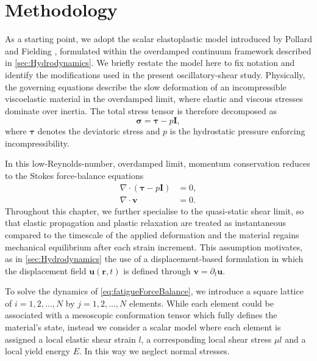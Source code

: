 \section{Methodology} \label{sec:fatigueMethodology}

As a starting point, we adopt the scalar elastoplastic model introduced by Pollard and Fielding \cite{pollard_yielding_2022}, formulated within the overdamped continuum framework described in \cref{sec:Hydrodynamics}. We briefly restate the model here to fix notation and identify the modifications used in the present oscillatory-shear study. Physically, the governing equations describe the slow deformation of an incompressible viscoelastic material in the overdamped limit, where elastic and viscous stresses dominate over inertia. The total stress tensor is therefore decomposed as
\[
    \bm{\sigma} = \bm{\tau} - p\bm{I},
\]
where $\bm{\tau}$ denotes the deviatoric stress and $p$ is the hydrostatic pressure enforcing incompressibility.

In this low-Reynolds-number, overdamped limit, momentum conservation reduces to the Stokes force-balance equations
\begin{subequations}
\label{eq:fatigueForceBalance}
\begin{align}
\nabla \cdot (\bm{\tau} - p\bm{I}) &= 0, \\
\nabla \cdot \bm{v} &= 0.
\end{align}
\end{subequations}
Throughout this chapter, we further specialise to the quasi-static shear limit, so that elastic propagation and plastic relaxation are treated as instantaneous compared to the timescale of the applied deformation and the material regains mechanical equilibrium after each strain increment. This assumption motivates, as in \cref{sec:Hydrodynamics} the use of a displacement-based formulation in which the displacement field $\bm{u}(\bm{r},t)$ is defined through $\bm{v} = \partial_t \bm{u}$.

To solve the dynamics of \cref{eq:fatigueForceBalance}, we introduce a square lattice of $i=1,2,\ldots,N$ by $j=1,2,\ldots,N$ elements. While each element could be associated with a mesoscopic conformation tensor which fully defines the material's state, instead we consider a scalar model where each element is assigned a local elastic shear strain $l$, a corresponding local shear stress $\mu l$ and a local yield energy $E$. In this way we neglect normal stresses.

